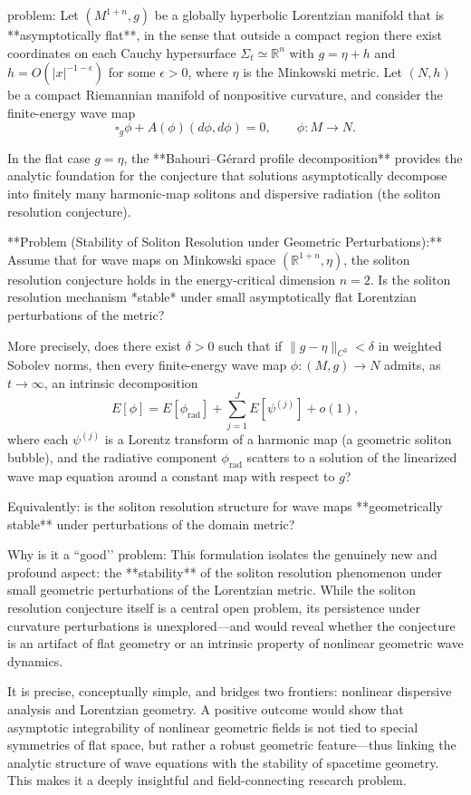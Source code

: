problem:  
Let \((M^{1+n}, g)\) be a globally hyperbolic Lorentzian manifold that is **asymptotically flat**, in the sense that outside a compact region there exist coordinates on each Cauchy hypersurface \(\Sigma_t \simeq \mathbb{R}^n\) with \(g = \eta + h\) and \(h = O(|x|^{-1-\epsilon})\) for some \(\epsilon > 0\), where \(\eta\) is the Minkowski metric.  
Let \((N,h)\) be a compact Riemannian manifold of nonpositive curvature, and consider the finite-energy wave map
\[
\square_g \phi + A(\phi)(d\phi,d\phi) = 0, \qquad \phi : M \to N.
\]

In the flat case \(g=\eta\), the **Bahouri–Gérard profile decomposition** provides the analytic foundation for the conjecture that solutions asymptotically decompose into finitely many harmonic-map solitons and dispersive radiation (the soliton resolution conjecture).  

**Problem (Stability of Soliton Resolution under Geometric Perturbations):**  
Assume that for wave maps on Minkowski space \((\mathbb{R}^{1+n},\eta)\), the soliton resolution conjecture holds in the energy-critical dimension \(n=2\).  
Is the soliton resolution mechanism *stable* under small asymptotically flat Lorentzian perturbations of the metric?  

More precisely, does there exist \(\delta > 0\) such that if \(\|g - \eta\|_{C^3} < \delta\) in weighted Sobolev norms, then every finite-energy wave map \(\phi:(M,g)\to N\) admits, as \(t\to\infty\), an intrinsic decomposition
\[
E[\phi] = E[\phi_{\mathrm{rad}}] + \sum_{j=1}^J E[\psi^{(j)}] + o(1),
\]
where each \(\psi^{(j)}\) is a Lorentz transform of a harmonic map (a geometric soliton bubble), and the radiative component \(\phi_{\mathrm{rad}}\) scatters to a solution of the linearized wave map equation around a constant map with respect to \(g\)?  

Equivalently: is the soliton resolution structure for wave maps **geometrically stable** under perturbations of the domain metric?

Why is it a “good’’ problem:  
This formulation isolates the genuinely new and profound aspect: the **stability** of the soliton resolution phenomenon under small geometric perturbations of the Lorentzian metric. While the soliton resolution conjecture itself is a central open problem, its persistence under curvature perturbations is unexplored—and would reveal whether the conjecture is an artifact of flat geometry or an intrinsic property of nonlinear geometric wave dynamics.  

It is precise, conceptually simple, and bridges two frontiers: nonlinear dispersive analysis and Lorentzian geometry. A positive outcome would show that asymptotic integrability of nonlinear geometric fields is not tied to special symmetries of flat space, but rather a robust geometric feature—thus linking the analytic structure of wave equations with the stability of spacetime geometry. This makes it a deeply insightful and field-connecting research problem.